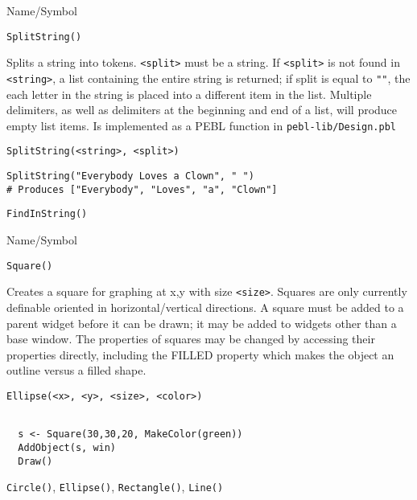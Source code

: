 \begin{desc}{Name/Symbol}
\item[Name/Symbol]  	\verb+SplitString()+

\item[Description]	Splits a string into tokens. \verb+<split>+ must be a string. If 
		\verb+<split>+ is not found in \verb+<string>+, a list containing the entire 
		string is returned; if split is equal to \verb+""+, the each letter 
		in the string is placed into a different item in the list.  
		Multiple delimiters, as well as delimiters at the beginning 
		and end of a list, will produce empty list items. 
		Is implemented as a PEBL function in \texttt{pebl-lib/Design.pbl}

\item[Usage]
\begin{verbatim}
SplitString(<string>, <split>)
\end{verbatim}

\item[Example]      	
\begin{verbatim}
SplitString("Everybody Loves a Clown", " ") 
# Produces ["Everybody", "Loves", "a", "Clown"]
\end{verbatim}

\item[See Also]     	\verb+FindInString()+
\end{desc}

\rl




\begin{desc}{Name/Symbol}
\item[Name/Symbol]	\verb+Square()+
  
\item[Description]	Creates a square for graphing at x,y with size
  \verb+<size>+. Squares are only currently definable oriented in
  horizontal/vertical directions.  A square  must be added
  to a parent widget before it can be drawn; it may be added to
  widgets other than a base window.  The properties of squares may be
  changed by accessing their properties directly, including the FILLED
  property which makes the object an outline versus a filled shape.

\item[Usage]
\begin{verbatim}
Ellipse(<x>, <y>, <size>, <color>)
\end{verbatim}

\item[Example]	
\begin{verbatim}
  
  s <- Square(30,30,20, MakeColor(green))
  AddObject(s, win)
  Draw()

\end{verbatim}
\item[See Also]	 \verb+Circle()+, \verb+Ellipse()+, \verb+Rectangle()+, \verb+Line()+
\end{desc}

